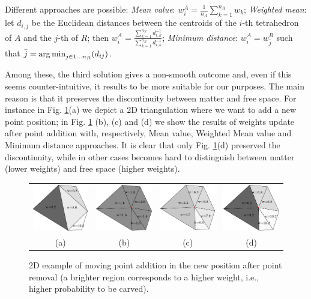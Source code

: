 Different approaches are possible: \emph{Mean value}: $w_i^A = \frac{1}{n_A}\sum_{k=1}^{n_R} w_{k}$; \emph{Weighted mean}: let $d_{i,j}$ be the Euclidean distances between the centroids of the $i$-th tetrahedron of $A$ and the $j$-th of $R$; then $w_i^A = \frac{\sum_{k=1}^{n_R}d_{i,k}^{-1}}{\sum_{k=1}^{n_R}d_{i,k}^{-1}}$; \emph{Minimum distance}: $w_i^A = w_{\bar{j}}^R$ such that $\bar{j} = \operatorname*{arg\,min}_{j \in {1\dots n_R}}(d_{ij})$.

Among these, the third solution gives a non-smooth outcome and, even if this seems counter-intuitive, it results to be more suitable for our purposes. The main reason is that it preserves the discontinuity between matter and free space. For instance in Fig. \ref{fig:reconstrEx_2}(a) we depict a 2D triangulation where we want to add a new point position; in Fig. \ref{fig:reconstrEx_2} (b), (c) and (d) we show the results of weights update after point addition with, respectively, Mean value, Weighted Mean value and Minimum distance approaches. 
It is clear that only Fig. \ref{fig:reconstrEx_2}(d) preserved the discontinuity, while in other cases becomes hard to distinguish between matter (lower weights) and free space (higher weights). 


\begin{figure}[t]
\begin{center}
\begin{tabular}{cccc}
\centering
\includegraphics[width=0.21\columnwidth]{./img//mooving_orig}&
\includegraphics[width=0.21\columnwidth]{./img//mooving_avg}&
\includegraphics[width=0.21\columnwidth]{./img//mooving_weighted_avg}&
\includegraphics[width=0.21\columnwidth]{./img//mooving_min}\\
(a) & (b) & (c) & (d)\\
\end{tabular}
\end{center}
\caption{2D example of moving point addition in the new position after point removal (a brighter region corresponds to a higher weight, i.e., higher probability to be carved).}
\label{fig:reconstrEx_2}
\end{figure}

